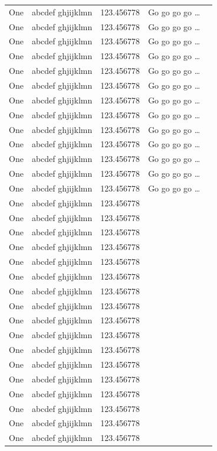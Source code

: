 \documentclass[phd,showgrids]{ndsu-thesis-2022}
\begin{document}
\begin{longtable}{l l l l r}
One & abcdef ghjijklmn & 123.456778  & Go go go go \ldots \\
One & abcdef ghjijklmn & 123.456778  & Go go go go \ldots \\
One & abcdef ghjijklmn & 123.456778  & Go go go go \ldots \\
One & abcdef ghjijklmn & 123.456778  & Go go go go \ldots \\
One & abcdef ghjijklmn & 123.456778  & Go go go go \ldots \\
One & abcdef ghjijklmn & 123.456778  & Go go go go \ldots \\
One & abcdef ghjijklmn & 123.456778  & Go go go go \ldots \\
One & abcdef ghjijklmn & 123.456778  & Go go go go \ldots \\
One & abcdef ghjijklmn & 123.456778  & Go go go go \ldots \\
One & abcdef ghjijklmn & 123.456778  & Go go go go \ldots \\
One & abcdef ghjijklmn & 123.456778  & Go go go go \ldots \\
One & abcdef ghjijklmn & 123.456778  & Go go go go \ldots \\
One & abcdef ghjijklmn & 123.456778  & Go go go go \ldots \\
One & abcdef ghjijklmn & 123.456778 \\
One & abcdef ghjijklmn & 123.456778 \\
One & abcdef ghjijklmn & 123.456778 \\
One & abcdef ghjijklmn & 123.456778 \\
One & abcdef ghjijklmn & 123.456778 \\
One & abcdef ghjijklmn & 123.456778 \\
One & abcdef ghjijklmn & 123.456778 \\
One & abcdef ghjijklmn & 123.456778 \\
One & abcdef ghjijklmn & 123.456778 \\
One & abcdef ghjijklmn & 123.456778 \\
One & abcdef ghjijklmn & 123.456778 \\
One & abcdef ghjijklmn & 123.456778 \\
One & abcdef ghjijklmn & 123.456778 \\
One & abcdef ghjijklmn & 123.456778 \\
One & abcdef ghjijklmn & 123.456778 \\
One & abcdef ghjijklmn & 123.456778 \\
One & abcdef ghjijklmn & 123.456778 \\

\end{longtable}
\end{document}
